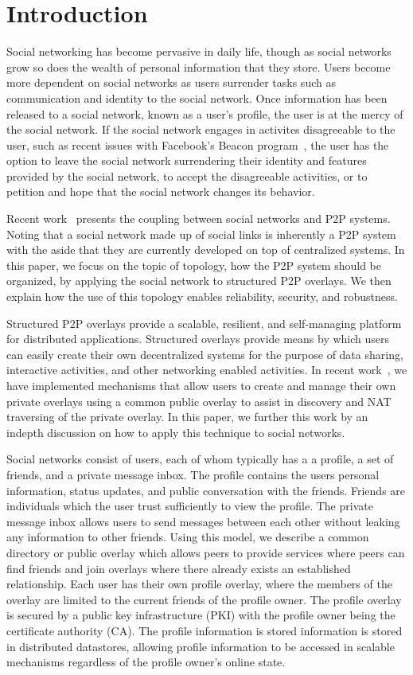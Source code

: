 \documentclass[letterpaper,twocolumn,10pt]{article}
\begin{document}
\section{Introduction}
Social networking has become pervasive in daily life, though as social networks
grow so does the wealth of personal information that they store.  Users become
more dependent on social networks as users surrender tasks such as communication
and identity to the social network.  Once information has been released to a
social network, known as a user's profile, the user is at the mercy of the
social network.  If the social network engages in activites disagreeable to the
user, such as recent issues with Facebook's Beacon program~\cite{facebook_beacon},
the user has the option to leave the social network surrendering their identity
and features provided by the social network, to accept the disagreeable
activities, or to petition and hope that the social network changes its behavior.

Recent work~\cite{p2p_socialnetwork} presents the coupling between social
networks and P2P systems.  Noting that a social network made up of social
links is inherently a P2P system with the aside that they are currently
developed on top of centralized systems.  In this paper, we focus on the
topic of topology, how the P2P system should be organized, by applying the
social network to structured P2P overlays.  We then explain how the use of
this topology enables reliability, security, and robustness.

Structured P2P overlays provide a scalable, resilient, and self-managing
platform for distributed applications.  Structured overlays provide means
by which users can easily create their own decentralized systems for the
purpose of data sharing, interactive activities, and other networking enabled
activities.  In recent work~\cite{icdcs10}, we have implemented mechanisms that
allow users to create and manage their own private overlays using a common
public overlay to assist in discovery and NAT traversing of the private overlay.
In this paper, we further this work by an indepth discussion on how to apply
this technique to social networks.

Social networks consist of users, each of whom typically has a a profile, a set
of friends, and a private message inbox.  The profile contains the users
personal information, status updates, and public conversation with the friends.
Friends are individuals which the user trust sufficiently to view the profile.
The private message inbox allows users to send messages between each other
without leaking any information to other friends.  Using this model, we
describe a common directory or public overlay which allows peers to provide
services where peers can find friends and join overlays where there already
exists an established relationship.  Each user has their own profile overlay,
where the members of the overlay are limited to the current friends of the
profile owner.  The profile overlay is secured by a public key infrastructure
(PKI) with the profile owner being the certificate authority (CA).  The profile
information is stored information is stored in distributed datastores, allowing
profile information to be accessed in scalable mechanisms regardless of the
profile owner's online state.
\end{document}
